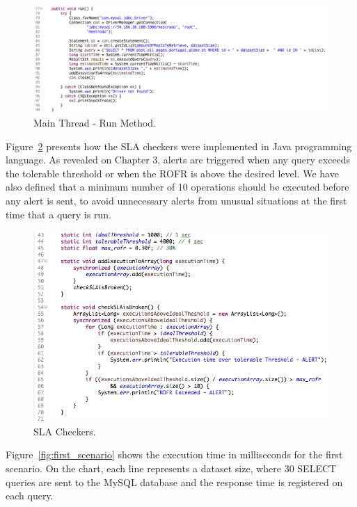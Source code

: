 \begin{figure}[ht!]
\centering
\includegraphics[width=150mm]{Imagens/core-execution-01-2.png}
\caption{Main Thread - Run Method. \label{fig:core-execution-01.2}}
\end{figure}


Figure~\ref{fig:core-execution-01.3} presents how the SLA checkers were implemented in Java programming language. As revealed on Chapter 3, alerts are triggered when any query exceeds the tolerable threshold or when the ROFR is above the desired level. We have also defined that a minimum number of 10 operations should be executed before any alert is sent, to avoid unnecessary alerts from unusual situations at the first time that a query is run.

\begin{figure}[ht!]
\centering
\includegraphics[width=120mm]{Imagens/core-execution-01-3.png}
\caption{SLA Checkers. \label{fig:core-execution-01.3}}
\end{figure}


Figure~\ref{fig:first_scenario} shows the execution time in milliseconds for the first scenario. On the chart, each line represents a dataset size, where 30 SELECT queries are sent to the MySQL database and the response time is registered on each query. 

